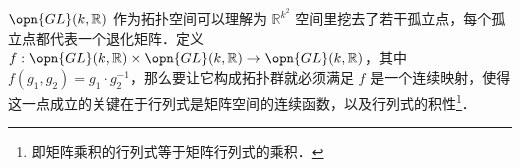 $\opn{GL}(k, \mathbb{R})$ 作为拓扑空间可以理解为 $\mathbb{R}^{k^2}$ 空间里挖去了若干孤立点，每个孤立点都代表一个退化矩阵．定义 $f:\opn{GL}(k, \mathbb{R})\times\opn{GL}(k, \mathbb{R})\to\opn{GL}(k, \mathbb{R})$，其中 $f(g_1, g_2)=g_1\cdot g_2^{-1}$，那么要让它构成拓扑群就必须满足 $f$ 是一个连续映射，使得这一点成立的关键在于行列式是矩阵空间的连续函数，以及行列式的积性\footnote{即矩阵乘积的行列式等于矩阵行列式的乘积．}．








